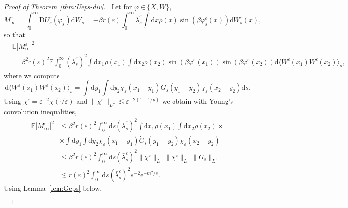 \documentclass[11pt, a4paper]{scrartcl}
\numberwithin{equation}{section}
\theoremstyle{plain}
\theoremstyle{remark}
\newcommand{\Iota}{\mathrm{I}}
\newcommand{\mathD}{\mathrm{D}}
\newcommand{\mathd}{\mathrm{d}}
\newcommand{\mathe}{\mathrm{e}}
\newcommand{\tmtextbf}[1]{\text{{\bfseries{#1}}}}
\begin{document}
\begin{proof}[Proof of Theorem~\ref{thm:Ueps-div}]
	\tmtextbf{$(\Iota \Iota \Iota^{\varepsilon})$} \ Let for $\varphi\in\{X,W\}$,
	\[ M^{\varepsilon}_{\infty} = \int_0^{\infty} \mathD
		U^{\varepsilon}_s (\varphi_s) \mathd W_s = - \beta r (\varepsilon)
		\int_0^{\infty} \bar{\lambda}^{\varepsilon}_s \int \mathd x \rho (x) \sin
		(\beta \varphi_s^{\varepsilon} (x)) \mathd W_s^{\varepsilon} (x), \]
	so that
		{\small\begin{align*}
				 & \mathbb{E} | M_{\infty}^{\varepsilon} |^2 \\
				 & = \beta^2 r (\varepsilon)^2
				\mathbb{E} \int_0^{\infty}  (\bar{\lambda}_s^{\varepsilon})^2  \int \mathd x_1
				\rho (x_1)  \int \mathd x_2 \rho (x_2) \sin (\beta \varphi^{\varepsilon}
					(x_1)) \sin (\beta \varphi^{\varepsilon} (x_2)) \mathd \langle
				W^{\varepsilon} (x_1) W^{\varepsilon} (x_2) \rangle_s,
			\end{align*}}
	where we compute
	\[ \mathd \langle W^{\varepsilon} (x_1) W^{\varepsilon} (x_2) \rangle_s =
		\int \mathd y_1 \int \mathd y_2 \chi_{\varepsilon} (x_1 - y_1) \dot{G}_s
		(y_1 - y_2) \chi_{\varepsilon} (x_2 - y_2) \mathd s. \]
	Using $\chi^{\varepsilon} = \varepsilon^{- 2} \chi (\cdot / \varepsilon)$
	and $\| \chi^{\varepsilon} \|_{L^p} \lesssim \varepsilon^{- 2 (1 - 1 / p)}$
	we obtain with Young's convolution inequalities,
	\[ \begin{aligned}
			\mathbb{E} | M_{\infty}^{\varepsilon} |^2 & \leqslant  \beta^2 r
			(\varepsilon)^2 \int_0^{\infty} \mathd s (\bar{\lambda}_s^{\varepsilon})^2
			\int \mathd x_1 \rho (x_1)  \int \mathd x_2 \rho (x_2) \times                                              \\
			                                          & \times\int \mathd y_1
			\int \mathd y_2 \chi_{\varepsilon} (x_1 - y_1) \dot{G}_s (y_1 - y_2)
			\chi_{\varepsilon} (x_2 - y_2)                                                                             \\
			                                          & \leqslant  \beta^2 r (\varepsilon)^2  \int_0^{\infty} \mathd s
			(\bar{\lambda}_s^{\varepsilon})^2  \| \chi^{\varepsilon} \|_{L^1} \|
			\chi^{\varepsilon} \|_{L^1} \| \dot{G}_s \|_{L^1}                                                          \\
			                                          & \lesssim  r (\varepsilon)^2  \int_0^{\infty} \mathd s
			(\bar{\lambda}_s^{\varepsilon})^2 s^{- 2} \mathe^{- m^2 / s}.
		\end{aligned} \]
	Using Lemma~\ref{lem:Geps} below,
	\[ \begin{aligned}

\end{aligned}\]
\end{proof}
\end{document}
